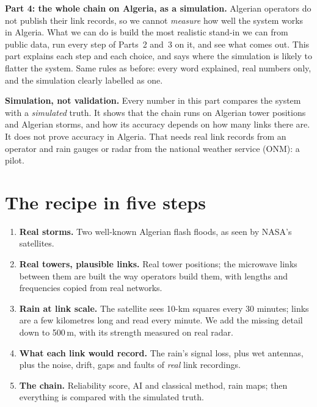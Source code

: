 
\clearpage
\begin{center}
\begin{minipage}{0.86\textwidth}
\small
\textbf{Part 4: the whole chain on Algeria, as a simulation.} Algerian operators do not publish their link records, so we
cannot \emph{measure} how well the system works in Algeria. What we can do is build the most realistic stand-in we can
from public data, run every step of Parts~2 and~3 on it, and see what comes out. This part explains each step and each
choice, and says where the simulation is likely to flatter the system. Same rules as before: every word explained, real
numbers only, and the simulation clearly labelled as one.
\end{minipage}
\end{center}

\begin{careful}
\textbf{Simulation, not validation.} Every number in this part compares the system with a \emph{simulated} truth. It shows
that the chain runs on Algerian tower positions and Algerian storms, and how its accuracy depends on how many links there
are. It does not prove accuracy in Algeria. That needs real link records from an operator and rain gauges or radar from
the national weather service (ONM): a pilot.
\end{careful}

\section{The recipe in five steps}
\label{sec:p4_recipe}
\begin{enumerate}
\item \textbf{Real storms.} Two well-known Algerian flash floods, as seen by NASA's satellites.
\item \textbf{Real towers, plausible links.} Real tower positions; the microwave links between them are built the way
operators build them, with lengths and frequencies copied from real networks.
\item \textbf{Rain at link scale.} The satellite sees 10-km squares every 30 minutes; links are a few kilometres long and read
every minute. We add the missing detail down to 500\,m, with its strength measured on real radar.
\item \textbf{What each link would record.} The rain's signal loss, plus wet antennas, plus the noise, drift, gaps and
faults of \emph{real} link recordings.
\item \textbf{The chain.} Reliability score, AI and classical method, rain maps; then everything is compared with the
simulated truth.
\end{enumerate}


